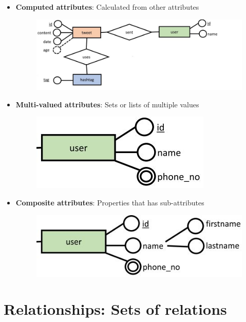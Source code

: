 \documentclass[conference]{IEEEtran}
\begin{document}
\begin{itemize}
    \item \textbf{Computed attributes}: Calculated from other attributes
    \begin{figure} [h!]
        \centering
        \includegraphics[scale=0.4]{Ex3.JPG}
    \end{figure}
    \item \textbf{Multi-valued attributes}: Sets or lists of multiple values
    \begin{figure} [h!]
        \centering
        \includegraphics[scale=0.4]{Ex4.JPG}
    \end{figure}
    \item \textbf{Composite attributes}: Properties that has sub-attributes
    \begin{figure} [h!]
        \centering
        \includegraphics[scale=0.4]{Ex5.JPG}
    \end{figure}
\end{itemize}

\pagebreak

\section{\textbf{Relationships: Sets of relations}}
\end{document}
